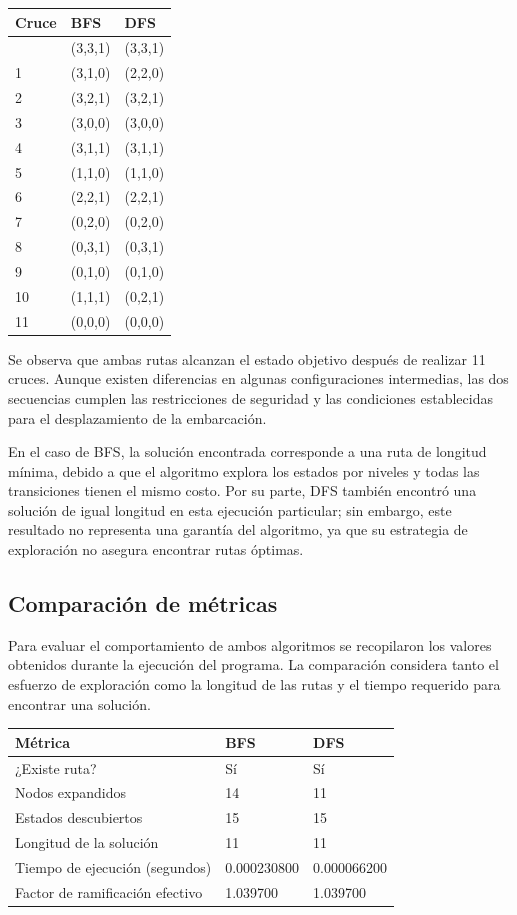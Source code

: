 \documentclass[
  spanish,
]{llncs}
\newcounter{none} %
\begin{document}
{\def\LTcaptype{none} %
\begin{longtable}[]{@{}lll@{}}
\toprule\noalign{}
Cruce & BFS & DFS \\
\midrule\noalign{}
\endhead
\bottomrule\noalign{}
\endlastfoot
0 & (3,3,1) & (3,3,1) \\
1 & (3,1,0) & (2,2,0) \\
2 & (3,2,1) & (3,2,1) \\
3 & (3,0,0) & (3,0,0) \\
4 & (3,1,1) & (3,1,1) \\
5 & (1,1,0) & (1,1,0) \\
6 & (2,2,1) & (2,2,1) \\
7 & (0,2,0) & (0,2,0) \\
8 & (0,3,1) & (0,3,1) \\
9 & (0,1,0) & (0,1,0) \\
10 & (1,1,1) & (0,2,1) \\
11 & (0,0,0) & (0,0,0) \\
\end{longtable}
}

Se observa que ambas rutas alcanzan el estado objetivo después de
realizar 11 cruces. Aunque existen diferencias en algunas
configuraciones intermedias, las dos secuencias cumplen las
restricciones de seguridad y las condiciones establecidas para el
desplazamiento de la embarcación.

En el caso de BFS, la solución encontrada corresponde a una ruta de
longitud mínima, debido a que el algoritmo explora los estados por
niveles y todas las transiciones tienen el mismo costo. Por su parte,
DFS también encontró una solución de igual longitud en esta ejecución
particular; sin embargo, este resultado no representa una garantía del
algoritmo, ya que su estrategia de exploración no asegura encontrar
rutas óptimas.

\subsection{Comparación de
métricas}\label{comparaciuxf3n-de-muxe9tricas}

Para evaluar el comportamiento de ambos algoritmos se recopilaron los
valores obtenidos durante la ejecución del programa. La comparación
considera tanto el esfuerzo de exploración como la longitud de las rutas
y el tiempo requerido para encontrar una solución.

{\def\LTcaptype{none} %
\begin{longtable}[]{@{}lll@{}}
\toprule\noalign{}
Métrica & BFS & DFS \\
\midrule\noalign{}
\endhead
\bottomrule\noalign{}
\endlastfoot
¿Existe ruta? & Sí & Sí \\
Nodos expandidos & 14 & 11 \\
Estados descubiertos & 15 & 15 \\
Longitud de la solución & 11 & 11 \\
Tiempo de ejecución (segundos) & 0.000230800 & 0.000066200 \\
Factor de ramificación efectivo & 1.039700 & 1.039700 \\
\end{longtable}
}
\end{document}
